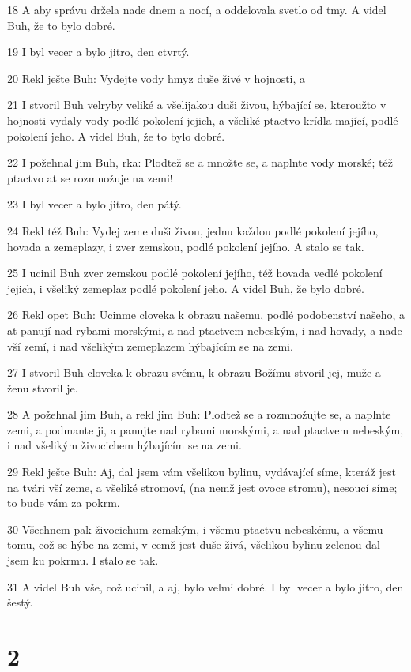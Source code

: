 \par 18  A aby správu držela nade dnem a nocí, a oddelovala svetlo od tmy. A videl Buh, že to bylo dobré.
\par 19  I byl vecer a bylo jitro, den ctvrtý.
\par 20  Rekl ješte Buh: Vydejte vody hmyz duše živé v hojnosti, a
\par 21  I stvoril Buh velryby veliké a všelijakou duši živou, hýbající se, kteroužto v hojnosti vydaly vody podlé pokolení jejich, a všeliké ptactvo krídla mající, podlé pokolení jeho. A videl Buh, že to bylo dobré.
\par 22  I požehnal jim Buh, rka: Plodtež se a množte se, a naplnte vody morské; též ptactvo at se rozmnožuje na zemi!
\par 23  I byl vecer a bylo jitro, den pátý.
\par 24  Rekl též Buh: Vydej zeme duši živou, jednu každou podlé pokolení jejího, hovada a zemeplazy, i zver zemskou, podlé pokolení jejího. A stalo se tak.
\par 25  I ucinil Buh zver zemskou podlé pokolení jejího, též hovada vedlé pokolení jejich, i všeliký zemeplaz podlé pokolení jeho. A videl Buh, že bylo dobré.
\par 26  Rekl opet Buh: Ucinme cloveka k obrazu našemu, podlé podobenství našeho, a at panují nad rybami morskými, a nad ptactvem nebeským, i nad hovady, a nade vší zemí, i nad všelikým zemeplazem hýbajícím se na zemi.
\par 27  I stvoril Buh cloveka k obrazu svému, k obrazu Božímu stvoril jej, muže a ženu stvoril je.
\par 28  A požehnal jim Buh, a rekl jim Buh: Plodtež se a rozmnožujte se, a naplnte zemi, a podmante ji, a panujte nad rybami morskými, a nad ptactvem nebeským, i nad všelikým živocichem hýbajícím se na zemi.
\par 29  Rekl ješte Buh: Aj, dal jsem vám všelikou bylinu, vydávající síme, kteráž jest na tvári vší zeme, a všeliké stromoví, (na nemž jest ovoce stromu), nesoucí síme; to bude vám za pokrm.
\par 30  Všechnem pak živocichum zemským, i všemu ptactvu nebeskému, a všemu tomu, což se hýbe na zemi, v cemž jest duše živá, všelikou bylinu zelenou dal jsem ku pokrmu. I stalo se tak.
\par 31  A videl Buh vše, což ucinil, a aj, bylo velmi dobré. I byl vecer a bylo jitro, den šestý.

\chapter{2}

